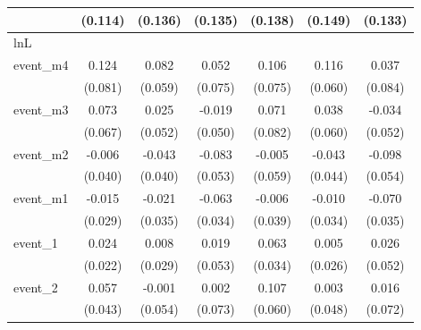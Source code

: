 {\begin{tabular}{l*{6}{c}}
            &     (0.114)         &     (0.136)         &     (0.135)         &     (0.138)         &     (0.149)         &     (0.133)         \\
\hline
lnL         &                     &                     &                     &                     &                     &                     \\
event\_m4    &       0.124         &       0.082         &       0.052         &       0.106         &       0.116         &       0.037         \\
            &     (0.081)         &     (0.059)         &     (0.075)         &     (0.075)         &     (0.060)         &     (0.084)         \\
[1em]
event\_m3    &       0.073         &       0.025         &      -0.019         &       0.071         &       0.038         &      -0.034         \\
            &     (0.067)         &     (0.052)         &     (0.050)         &     (0.082)         &     (0.060)         &     (0.052)         \\
[1em]
event\_m2    &      -0.006         &      -0.043         &      -0.083         &      -0.005         &      -0.043         &      -0.098         \\
            &     (0.040)         &     (0.040)         &     (0.053)         &     (0.059)         &     (0.044)         &     (0.054)         \\
[1em]
event\_m1    &      -0.015         &      -0.021         &      -0.063         &      -0.006         &      -0.010         &      -0.070\sym{*}  \\
            &     (0.029)         &     (0.035)         &     (0.034)         &     (0.039)         &     (0.034)         &     (0.035)         \\
[1em]
event\_1     &       0.024         &       0.008         &       0.019         &       0.063         &       0.005         &       0.026         \\
            &     (0.022)         &     (0.029)         &     (0.053)         &     (0.034)         &     (0.026)         &     (0.052)         \\
[1em]
event\_2     &       0.057         &      -0.001         &       0.002         &       0.107         &       0.003         &       0.016         \\
            &     (0.043)         &     (0.054)         &     (0.073)         &     (0.060)         &     (0.048)         &     (0.072)         \\

\end{tabular}}
